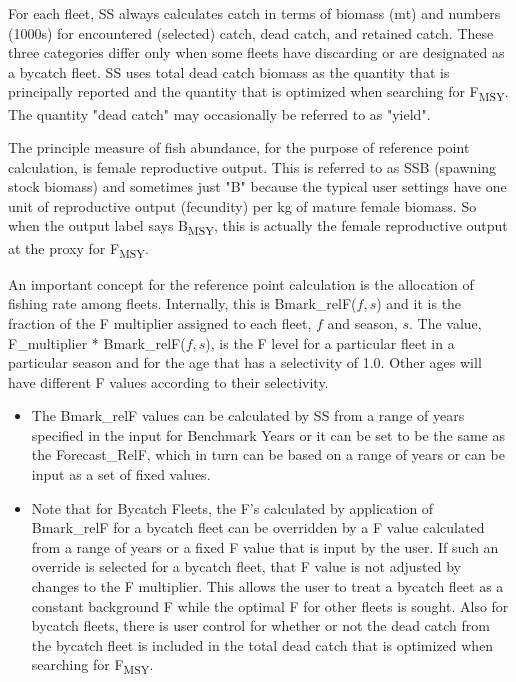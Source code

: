 For each fleet, SS always calculates catch in terms of biomass (mt) and numbers (1000s) for encountered (selected) catch, dead catch, and retained catch.  These three categories differ only when some fleets have discarding or are designated as a bycatch fleet.  SS uses total dead catch biomass as the quantity that is principally reported and the quantity that is optimized when searching for F\textsubscript{MSY}.  The quantity "dead catch" may occasionally be referred to as "yield".

The principle measure of fish abundance, for the purpose of reference point calculation, is female reproductive output.  This is referred to as SSB (spawning stock biomass) and sometimes just "B" because the typical user settings have one unit of reproductive output (fecundity) per kg of mature female biomass.  So when the output label says B\textsubscript{MSY}, this is actually the female reproductive output at the proxy for F\textsubscript{MSY}.

An important concept for the reference point calculation is the allocation of fishing rate among fleets.  Internally, this is Bmark\_relF($f,s$) and it is the fraction of the F multiplier assigned to each fleet, $f$ and season, $s$.  The value, F\_multiplier * Bmark\_relF($f,s$), is the F level for a particular fleet in a particular season and for the age that has a selectivity of 1.0.  Other ages will have different F values according to their selectivity.
\begin{itemize}
	\item The Bmark\_relF values can be calculated by SS from a range of years specified in the input for Benchmark Years or it can be set to be the same as the Forecast\_RelF, which in turn can be based on a range of years or can be input as a set of fixed values.
	\item Note that for Bycatch Fleets, the F's calculated by application of Bmark\_relF for a bycatch fleet can be overridden by a F value calculated from a range of years or a fixed F value that is input by the user.  If such an override is selected for a bycatch fleet, that F value is not adjusted by changes to the F multiplier.  This allows the user to treat a bycatch fleet as a constant background F while the optimal F for other fleets is sought.  Also for bycatch fleets, there is user control for whether or not the dead catch from the bycatch fleet is included in the total dead catch that is optimized when searching for F\textsubscript{MSY}.
\end{itemize}


